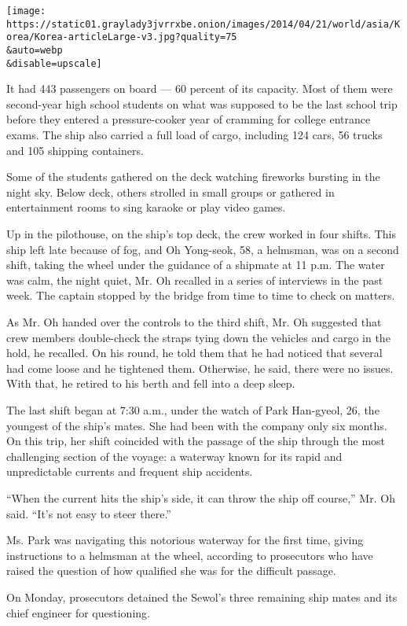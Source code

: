 \texttt{[image: https://static01.graylady3jvrrxbe.onion/images/2014/04/21/world/asia/Korea/Korea-articleLarge-v3.jpg?quality=75\\\&auto=webp\\\&disable=upscale]}

It had 443 passengers on board --- 60 percent of its capacity. Most of
them were second-year high school students on what was supposed to be
the last school trip before they entered a pressure-cooker year of
cramming for college entrance exams. The ship also carried a full load
of cargo, including 124 cars, 56 trucks and 105 shipping containers.

Some of the students gathered on the deck watching fireworks bursting in
the night sky. Below deck, others strolled in small groups or gathered
in entertainment rooms to sing karaoke or play video games.

Up in the pilothouse, on the ship's top deck, the crew worked in four
shifts. This ship left late because of fog, and Oh Yong-seok, 58, a
helmsman, was on a second shift, taking the wheel under the guidance of
a shipmate at 11 p.m. The water was calm, the night quiet, Mr. Oh
recalled in a series of interviews in the past week. The captain stopped
by the bridge from time to time to check on matters.

As Mr. Oh handed over the controls to the third shift, Mr. Oh suggested
that crew members double-check the straps tying down the vehicles and
cargo in the hold, he recalled. On his round, he told them that he had
noticed that several had come loose and he tightened them. Otherwise, he
said, there were no issues. With that, he retired to his berth and fell
into a deep sleep.

The last shift began at 7:30 a.m., under the watch of Park Han-gyeol,
26, the youngest of the ship's mates. She had been with the company only
six months. On this trip, her shift coincided with the passage of the
ship through the most challenging section of the voyage: a waterway
known for its rapid and unpredictable currents and frequent ship
accidents.

``When the current hits the ship's side, it can throw the ship off
course,'' Mr. Oh said. ``It's not easy to steer there.''

Ms. Park was navigating this notorious waterway for the first time,
giving instructions to a helmsman at the wheel, according to prosecutors
who have raised the question of how qualified she was for the difficult
passage.

On Monday, prosecutors detained the Sewol's three remaining ship mates
and its chief engineer for questioning.

